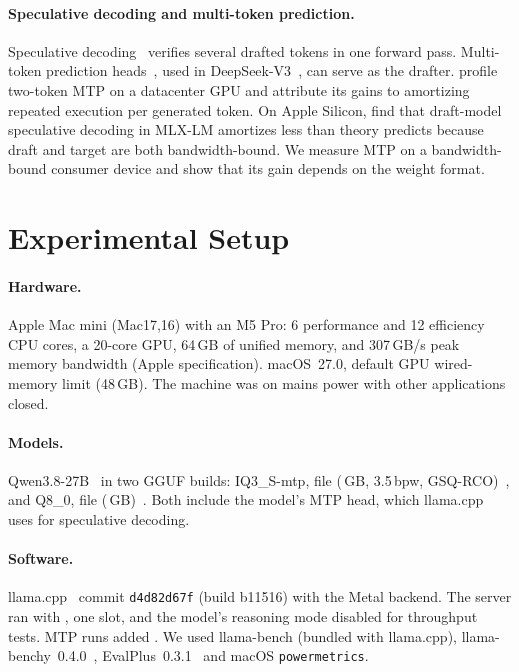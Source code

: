\documentclass[11pt]{article}
\begin{document}
\paragraph{Speculative decoding and multi-token prediction.}
Speculative decoding~\cite{leviathan2023speculative,chen2023speculative} verifies several
drafted tokens in one forward pass. Multi-token prediction heads~\cite{gloeckle2024mtp},
used in DeepSeek-V3~\cite{deepseek2024v3}, can serve as the drafter.
\citet{sah2026beneath} profile two-token MTP on a datacenter GPU and attribute its gains to
amortizing repeated execution per generated token. On Apple Silicon,
\citet{fonal2026crossfamily} find that draft-model speculative decoding in MLX-LM amortizes less
than theory predicts because draft and target are both bandwidth-bound. We measure MTP on a bandwidth-bound
consumer device and show that its gain depends on the weight format.

\section{Experimental Setup}
\label{sec:setup}

\paragraph{Hardware.}
Apple Mac mini (Mac17,16) with an M5 Pro: 6 performance and 12 efficiency CPU cores, a
20-core GPU, 64\,GB of unified memory, and 307\,GB/s peak memory bandwidth (Apple
specification). macOS~27.0, default GPU wired-memory limit (48\,GB). The machine was on mains
power with other applications closed.

\paragraph{Models.}
Qwen3.8-27B~\cite{qwen38card} in two GGUF builds:
IQ3\_S-mtp, file  (\IQsizeGB\,GB, 3.5\,bpw,
GSQ-RCO)~\cite{istagguf}, and Q8\_0, file 
(\QEsizeGB\,GB)~\cite{unslothgguf}. Both include the model's MTP head, which llama.cpp uses
for speculative decoding.

\paragraph{Software.}
llama.cpp~\cite{llamacpp} commit \texttt{d4d82d67f} (build b11516) with the Metal backend.
The server ran with  
 , one slot, and the model's reasoning mode disabled for throughput tests. MTP
runs added  . We used llama-bench (bundled
with llama.cpp), llama-benchy~0.4.0~\cite{llamabenchy}, EvalPlus~0.3.1~\cite{evalplussoftware}
and macOS \texttt{powermetrics}.
\end{document}

